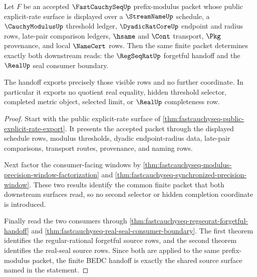 \begin{theorem}
\label{thm:fastcauchyseq-explicit-rate-regseqrat-real-handoff}
Let $F$ be an accepted $\FastCauchySeqUp$ prefix-modulus packet whose public
explicit-rate surface is displayed over a $\StreamNameUp$ schedule, a
$\CauchyModulusUp$ threshold ledger, $\DyadicRatCoreUp$ endpoint and radius
rows, late-pair comparison ledgers, $\hsame$ and $\Cont$ transport, $\Pkg$
provenance, and local $\NameCert$ rows. Then the same finite packet determines
exactly both downstream reads: the $\RegSeqRatUp$ forgetful handoff and the
$\RealUp$ seal consumer boundary.

The handoff exports precisely those visible rows and no further coordinate. In
particular it exports no quotient real equality, hidden threshold selector,
completed metric object, selected limit, or $\RealUp$ completeness row.
\end{theorem}
\begin{proof}
Start with the public explicit-rate surface of
\autoref{thm:fastcauchyseq-public-explicit-rate-export}. It presents the
accepted packet through the displayed schedule rows, modulus thresholds,
dyadic endpoint-radius data, late-pair comparisons, transport routes,
provenance, and naming rows.

Next factor the consumer-facing windows by
\autoref{thm:fastcauchyseq-modulus-precision-window-factorization} and
\autoref{thm:fastcauchyseq-synchronized-precision-window}. These two results
identify the common finite packet that both downstream surfaces read, so no
second selector or hidden completion coordinate is introduced.

Finally read the two consumers through
\autoref{thm:fastcauchyseq-regseqrat-forgetful-handoff} and
\autoref{thm:fastcauchyseq-real-seal-consumer-boundary}. The first theorem
identifies the regular-rational forgetful source rows, and the second theorem
identifies the real-seal source rows. Since both are applied to the same
prefix-modulus packet, the finite BEDC handoff is exactly the shared source
surface named in the statement.
\end{proof}

